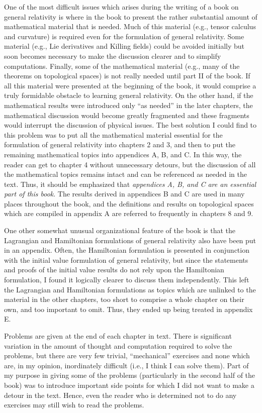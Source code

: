 One of the most difficult issues which arises during the writing of a book on general relativity is where in the book to present the rather substantial amount of mathematical material that is needed. Much of this material (e.g., tensor calculus and curvature) is required even for the formulation of general relativity. Some material (e.g., Lie derivatives and Killing fields) could be avoided initially but soon becomes necessary to make the discussion clearer and to simplify computations. Finally, some of the mathematical material (e.g., many of the theorems on topological spaces) is not really needed until part II of the book. If all this material were presented at the beginning of the book, it would comprise a truly formidable obstacle to learning general relativity. On the other hand, if the mathematical results were introduced only ``as needed'' in the later chapters, the mathematical discussion would become greatly fragmented and these fragments would interrupt the discussion of physical issues. The best solution I could find to this problem was to put all the mathematical material essential for the formulation of general relativity into chapters 2 and 3, and then to put the remaining mathematical topics into appendices A, B, and C. In this way, the reader can get to chapter 4 without unnecessary detours, but the discussion of all the mathematical topics remains intact and can be referenced as needed in the text. Thus, it should be emphasized that \emph{appendices A, B, and C are an essential part of this book}. The results derived in appendices B and C are used in many places throughout the book, and the definitions and results on topological spaces which are compiled in appendix A are referred to frequently in chapters 8 and 9.

One other somewhat unusual organizational feature of the book is that the Lagrangian and Hamiltonian formulations of general relativity also have been put in an appendix. Often, the Hamiltonian formulation is presented in conjunction with the initial value formulation of general relativity, but since the statements and proofs of the initial value results do not rely upon the Hamiltonian formulation, I found it logically clearer to discuss them independently. This left the Lagrangian and Hamiltonian formulations as topics which are unlinked to the material in the other chapters, too short to comprise a whole chapter on their own, and too important to omit. Thus, they ended up being treated in appendix E.

Problems are given at the end of each chapter in text. There is significant variation in the amount of thought and computation required to solve the problems, but there are very few trivial, ``mechanical'' exercises and none which are, in my opinion, inordinately difficult (i.e., I think I can solve them). Part of my purpose in giving some of the problems (particularly in the second half of the book) was to introduce important side points for which I did not want to make a detour in the text. Hence, even the reader who is determined not to do any exercises may still wish to read the problems.

